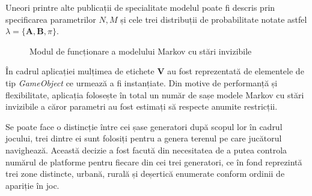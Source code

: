 Uneori printre alte publicații de specialitate modelul poate fi descris prin specificarea parametrilor $N,M$ și cele trei distribuții de probabilitate notate astfel $\lambda = \{\textbf{A},\textbf{B},\pi\}$.\par
\vspace{10mm}
\begin{figure}[H]
\centering
{}
\caption{Modul de funcționare a modelului Markov cu stări invizibile}
\end{figure}
\par

În cadrul aplicației mulțimea de etichete \textbf{V} au fost reprezentată de elementele de tip \textit{GameObject} ce urmează a fi instanțiate. Din motive de performanță și flexibilitate, aplicația folosește în total un număr de sașe modele Markov cu stări invizibile a căror parametri au fost estimați să respecte anumite restricții.\par

Se poate face o distincție între cei șase generatori după scopul lor în cadrul jocului, trei dintre ei sunt folosiți pentru a genera terenul pe care jucătorul navighează. Această decizie a fost facută din necesitatea de a putea controla numărul de platforme pentru fiecare din cei trei generatori, ce în fond reprezintă trei zone distincte, urbană, rurală și deșertică enumerate conform ordinii de apariție în joc.\par

